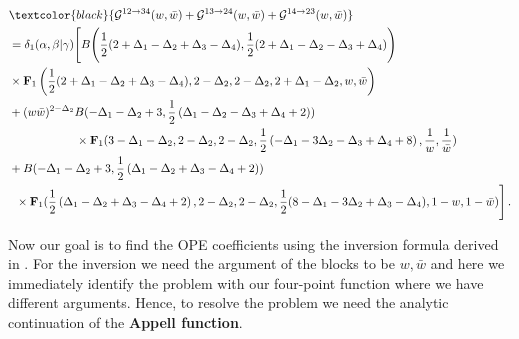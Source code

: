 \begin{align}
    \begin{split}
    \label{4.16o}
       & \textcolor{black}{\mathcal{G}^{12\to 34}(w,\bar w)+\mathcal{G}^{13\to 24}(w,\bar w)+\mathcal{G}^{14\to 23}(w,\bar w)}\\ &
=\delta_1(\alpha,\beta|\gamma)\Bigg[B\Bigg(\frac{1}{2}(2+\Delta_1-\Delta_2+\Delta_3-\Delta_4),\frac{1}{2}(2+\Delta_1-\Delta_2-\Delta_3+\Delta_4)\Bigg)\\&\times \mathbf{F}_{1}\left(\frac{1}{2}(2+\Delta_1-\Delta_2+\Delta_3-\Delta_4),2-\Delta_2,2-\Delta_2,2+\Delta_1-\Delta_2,w,\bar w\right)\\&+(w\bar w)^{2-
       \Delta_2}B(-\Delta _1-\Delta _2+3,\frac{1}{2} \left(\Delta _1-\Delta _2-\Delta _3+\Delta _4+2\right))\\&
         \hspace{2 cm}\times \mathbf{F}
         _1(3-\Delta_1-\Delta_2,2-\Delta_2,2-\Delta_2,\frac{1}{2} \left(-\Delta _1-3 \Delta _2-\Delta _3+\Delta _4+8\right),\frac{1}{w},\frac{1}{\bar w})\\&+B(-\Delta _1-\Delta _2+3,\frac{1}{2} \left(\Delta _1-\Delta _2+\Delta _3-\Delta _4+2\right))\\&\hspace{0.2cm}\times\mathbf{F}_1(\frac{1}{2} \left(\Delta _1-\Delta _2+\Delta _3-\Delta _4+2\right),2-\Delta_2,2-\Delta_2,\frac{1}{2}(8-\Delta_1-3\Delta_2+\Delta_3-\Delta_4),1-w,1-\bar w)\Bigg]\,.
    \end{split}
\end{align}

\noindent
Now our goal is to find the OPE coefficients using the inversion formula derived in \cite{Caron-Huot:2017vep}. For the inversion we need the argument of the blocks to be $w, \bar w$ and here we immediately identify the problem with our four-point function where we have different arguments. Hence, to resolve the problem we need the analytic continuation of the \textbf{Appell function}.


